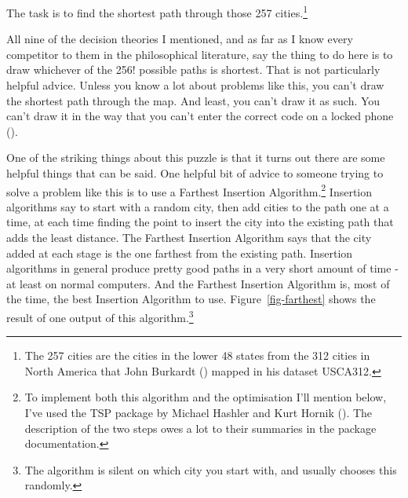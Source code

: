 \documentclass[
  10pt,
  letterpaper,
  DIV=11,
  numbers=noendperiod,
  twoside]{scrartcl}
\begin{document}
The task is to find the shortest path through those 257
cities.\footnote{The 257 cities are the cities in the lower 48 states
  from the 312 cities in North America that John Burkardt
  () mapped in his dataset USCA312.}

All nine of the decision theories I mentioned, and as far as I know
every competitor to them in the philosophical literature, say the thing
to do here is to draw whichever of the 256! possible paths is shortest.
That is not particularly helpful advice. Unless you know a lot about
problems like this, you can't draw the shortest path through the map.
And least, you can't draw it as such. You can't draw it in the way that
you can't enter the correct code on a locked phone
().

One of the striking things about this puzzle is that it turns out there
are some helpful things that can be said. One helpful bit of advice to
someone trying to solve a problem like this is to use a Farthest
Insertion Algorithm.\footnote{To implement both this algorithm and the
  optimisation I'll mention below, I've used the TSP package by Michael
  Hashler and Kurt Hornik (). The
  description of the two steps owes a lot to their summaries in the
  package documentation.} Insertion algorithms say to start with a
random city, then add cities to the path one at a time, at each time
finding the point to insert the city into the existing path that adds
the least distance. The Farthest Insertion Algorithm says that the city
added at each stage is the one farthest from the existing path.
Insertion algorithms in general produce pretty good paths in a very
short amount of time - at least on normal computers. And the Farthest
Insertion Algorithm is, most of the time, the best Insertion Algorithm
to use. Figure~\ref{fig-farthest} shows the result of one output of this
algorithm.\footnote{The algorithm is silent on which city you start
  with, and usually chooses this randomly.}
\end{document}
